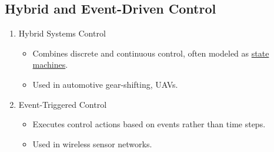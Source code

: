 \documentclass{article}
\begin{document}
\subsection{Hybrid and Event-Driven Control}
\begin{enumerate}
    \item Hybrid Systems Control
        \begin{itemize}
            \item Combines discrete and continuous control, often modeled as \underline{state machines}.
            \item Used in automotive gear-shifting, UAVs.
        \end{itemize}
    \item Event-Triggered Control
        \begin{itemize}
            \item Executes control actions based on events rather than time steps.
            \item Used in wireless sensor networks.
        \end{itemize}
\end{enumerate}







%
%









\end{document}
